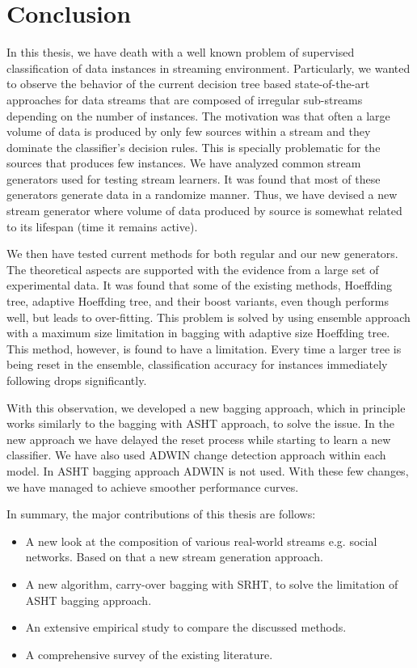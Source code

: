 \chapter{Conclusion}
\label{chp:conclude}

In this thesis, we have death with a well known problem of supervised classification of data instances in streaming environment. Particularly, we wanted to observe the behavior of the current decision tree based state-of-the-art approaches for data streams that are composed of irregular sub-streams depending on the number of instances. The motivation was that often a large volume of data is produced by only few sources within a stream and they dominate the classifier's decision rules. This is specially problematic for the sources that produces few instances. We have analyzed common stream generators used for testing stream learners. It was found that most of these generators generate data in a randomize manner. Thus, we have devised a new stream generator where volume of data produced by source is somewhat related to its lifespan (time it remains active). 

We then have tested current methods for both regular and our new generators. The theoretical aspects are supported with the evidence from a large set of experimental data. It was found that some of the existing methods, Hoeffding tree, adaptive Hoeffding tree, and their boost variants, even though performs well, but leads to over-fitting. This problem is solved by using ensemble approach with a maximum size limitation in bagging with adaptive size Hoeffding tree. This method, however, is found to have a limitation. Every time a larger tree is being reset in the ensemble, classification accuracy for instances immediately following drops significantly. 

With this observation, we developed a new bagging approach, which in principle works similarly to the bagging with ASHT approach, to solve the issue. In the new approach we have delayed the reset process while starting to learn a new classifier. We have also used ADWIN change detection approach within each model. In ASHT bagging approach ADWIN is not used. With these few changes, we have managed to achieve smoother performance curves.

In summary, the major contributions of this thesis are follows:

\begin{itemize}
    \item A new look at the composition of various real-world streams e.g. social networks. Based on that a new stream generation approach.
    
    \item A new algorithm, carry-over bagging with SRHT, to solve the limitation of ASHT bagging approach.
    
    \item An extensive empirical study to compare the discussed methods.
    
    \item A comprehensive survey of the existing literature.
\end{itemize}

